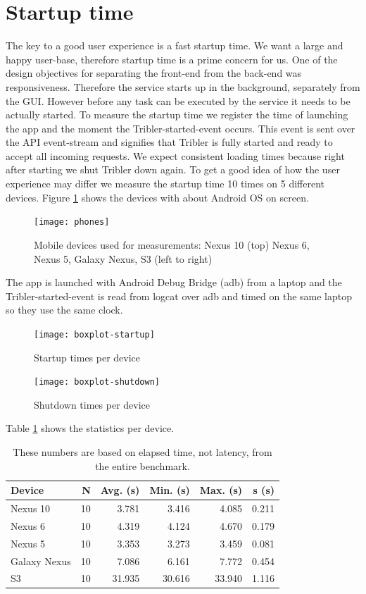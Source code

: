 \section{Startup time}
The key to a good user experience is a fast startup time.
We want a large and happy user-base, therefore startup time is a prime concern for us.
One of the design objectives for separating the front-end from the back-end was responsiveness.
Therefore the service starts up in the background, separately from the GUI.
However before any task can be executed by the service it needs to be actually started.
To measure the startup time we register the time of launching the app and the moment the Tribler-started-event occurs.
This event is sent over the API event-stream and signifies that Tribler is fully started and ready to accept all incoming requests.
We expect consistent loading times because right after starting we shut Tribler down again.
To get a good idea of how the user experience may differ we measure the startup time 10 times on 5 different devices.
Figure \ref{fig:phones} shows the devices with about Android OS on screen.
\begin{figure}[h]
	\centering
	\texttt{[image: phones]}
	\caption{Mobile devices used for measurements: Nexus 10 (top) Nexus 6, Nexus 5, Galaxy Nexus, S3 (left to right)}
	\label{fig:phones}
\end{figure}
The app is launched with Android Debug Bridge (adb) from a laptop and the Tribler-started-event is read from logcat over adb and timed on the same laptop so they use the same clock.
\begin{figure}[h]
	\centering %
	\texttt{[image: boxplot-startup]}
	\caption{Startup times per device}
	\label{fig:boxplot-startup}
\end{figure}
\begin{figure}[h]
	\centering %
	\texttt{[image: boxplot-shutdown]}
	\caption{Shutdown times per device}
	\label{fig:boxplot-shutdown}
\end{figure}
Table \ref{table:startup_time} shows the statistics per device.
\begin{table}
	\begin{tabular}{l | *{5}{r}} \hline
		Device & N & Avg. (s) & Min. (s) & Max. (s) & s (s) \\ \hline \hline
		Nexus 10        & 10 & 3.781 & 3.416 & 4.085 & 0.211 \\ \hline
		Nexus 6          & 10 & 4.319 & 4.124 & 4.670 & 0.179 \\ \hline
		Nexus 5          & 10 & 3.353 & 3.273 & 3.459 & 0.081 \\ \hline
		Galaxy Nexus & 10 & 7.086 & 6.161 & 7.772 & 0.454 \\ \hline
		S3                   & 10 & 31.935 & 30.616 & 33.940 & 1.116 \\ \hline
	\end{tabular}
	\caption[Total response time statistics]{These numbers are based on elapsed time, not latency, from the entire benchmark.}
	\label{table:startup_time}
\end{table}
